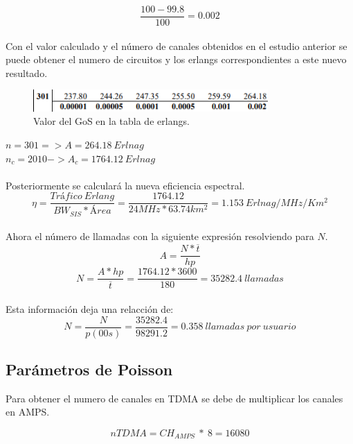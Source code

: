 \documentclass[11pt,letterpaper]{article}
\begin{document}
\begin{equation}
    \frac{100-99.8}{100}=0.002
\end{equation}
\\
Con el valor calculado y el número de canales obtenidos en el estudio anterior se puede 
obtener el numero de circuitos y los erlangs correspondientes a este nuevo resultado.

\begin{figure}[ht]
    \centering
    \includegraphics[width=0.8\textwidth]{imagenes/erl.png}
    \caption{Valor del GoS en la tabla de erlangs.}
\end{figure}


$n=301 => A=264.18 \ Erlnag$
\\ 
$n_c=2010->A_c=1764.12 \ Erlnag$
\\ \\
Posteriormente se calculará la nueva eficiencia espectral.
\begin{equation}
    \eta=\frac{Tráfico \ Erlang}{BW_{SIS}*Área}=\frac{1764.12}{24MHz*63.74km^2}=1.153 \ Erlnag/MHz/Km^2
\end{equation}
\\
Ahora el número de llamadas con la siguiente expresión resolviendo para $N$.
\begin{equation}
    A=\frac{N*\overline{t}}{hp}
\end{equation}
\begin{equation}
    N=\frac{A*hp}{\overline{t}}=\frac{1764.12*3600}{180}=35282.4 \ llamadas
\end{equation}
\\
Esta información deja una relacción de:
\begin{equation}
    N=\frac{N}{p(00s)}=\frac{35282.4}{98291.2}=0.358 \ llamadas \ por \ usuario
\end{equation}

\newpage
\subsection{Parámetros de Poisson}
Para obtener el numero de canales en TDMA se debe de multiplicar los canales 
en AMPS.

\begin{equation}
    nTDMA=CH_{AMPS} \ * \ 8=16080
\end{equation}
\end{document}

